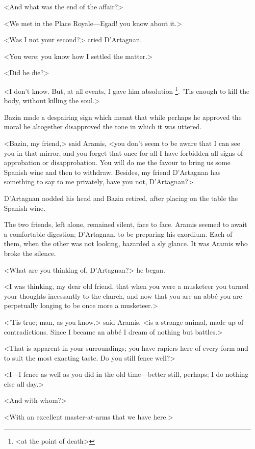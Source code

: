 <And what was the end of the affair?>

<We met in the Place Royale—Egad! you know about it.>

<Was I not your second?> cried D'Artagnan.

<You were; you know how I settled the matter.>

<Did he die?>

<I don't know. But, at all events, I gave him absolution \footnote{<at the point of death>}. 'Tis enough to kill the body, without killing the soul.>

Bazin made a despairing sign which meant that while perhaps he approved the moral he altogether disapproved the tone in which it was uttered.

<Bazin, my friend,> said Aramis, <you don't seem to be aware that I can see you in that mirror, and you forget that once for all I have forbidden all signs of approbation or disapprobation. You will do me the favour to bring us some Spanish wine and then to withdraw. Besides, my friend D'Artagnan has something to say to me privately, have you not, D'Artagnan?>

D'Artagnan nodded his head and Bazin retired, after placing on the table the Spanish wine.

The two friends, left alone, remained silent, face to face. Aramis seemed to await a comfortable digestion; D'Artagnan, to be preparing his exordium. Each of them, when the other was not looking, hazarded a sly glance. It was Aramis who broke the silence.

<What are you thinking of, D'Artagnan?> he began.

<I was thinking, my dear old friend, that when you were a musketeer you turned your thoughts incessantly to the church, and now that you are an abbé you are perpetually longing to be once more a musketeer.>

<'Tis true; man, as you know,> said Aramis, <is a strange animal, made up of contradictions. Since I became an abbé I dream of nothing but battles.>

<That is apparent in your surroundings; you have rapiers here of every form and to suit the most exacting taste. Do you still fence well?>

<I—I fence as well as you did in the old time—better still, perhaps; I do nothing else all day.>

<And with whom?>

<With an excellent master-at-arms that we have here.>

